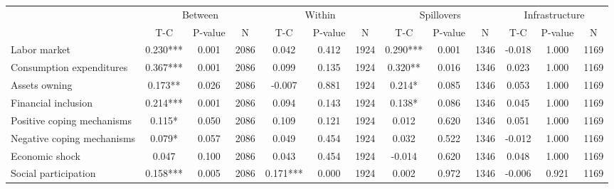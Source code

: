 
\begin{tabular}{l*{12}{c}}\hline&\multicolumn{3}{c}{Between}&\multicolumn{3}{c}{Within}&\multicolumn{3}{c}{Spillovers}&\multicolumn{3}{c}{Infrastructure} \\ \cmidrule(r){2-4}\cmidrule(l){5-7}\cmidrule(l){8-10}\cmidrule(l){9-13} & {T-C} & {P-value} & {N} & {T-C} & {P-value} & {N}  & {T-C} & {P-value} & {N} & {T-C} & {P-value} & {N} \\ \midrule

 Labor market &        0.230*** &        0.001 & 2086    &        0.042 &        0.412 & 1924    &        0.290*** &        0.001 & 1346 &       -0.018 &        1.000 & 1169 \\ 

 Consumption expenditures &        0.367*** &        0.001 & 2086    &        0.099 &        0.135 & 1924    &        0.320** &        0.016 & 1346 &        0.023 &        1.000 & 1169 \\ 

 Assets owning &        0.173** &        0.026 & 2086    &       -0.007 &        0.881 & 1924    &        0.214* &        0.085 & 1346 &        0.053 &        1.000 & 1169 \\ 

 Financial inclusion &        0.214*** &        0.001 & 2086    &        0.094 &        0.143 & 1924    &        0.138* &        0.086 & 1346 &        0.045 &        1.000 & 1169 \\ 

 Positive coping mechanisms &        0.115* &        0.050 & 2086    &        0.109 &        0.121 & 1924    &        0.012 &        0.620 & 1346 &        0.051 &        1.000 & 1169 \\ 

 Negative coping mechanisms &        0.079* &        0.057 & 2086    &        0.049 &        0.454 & 1924    &        0.032 &        0.522 & 1346 &       -0.012 &        1.000 & 1169 \\ 

 Economic shock &        0.047 &        0.100 & 2086    &        0.043 &        0.454 & 1924    &       -0.014 &        0.620 & 1346 &        0.048 &        1.000 & 1169 \\ 

 Social participation &        0.158*** &        0.005 & 2086    &        0.171*** &        0.000 & 1924    &        0.002 &        0.972 & 1346 &       -0.006 &        0.921 & 1169 \\ 


\end{tabular}

